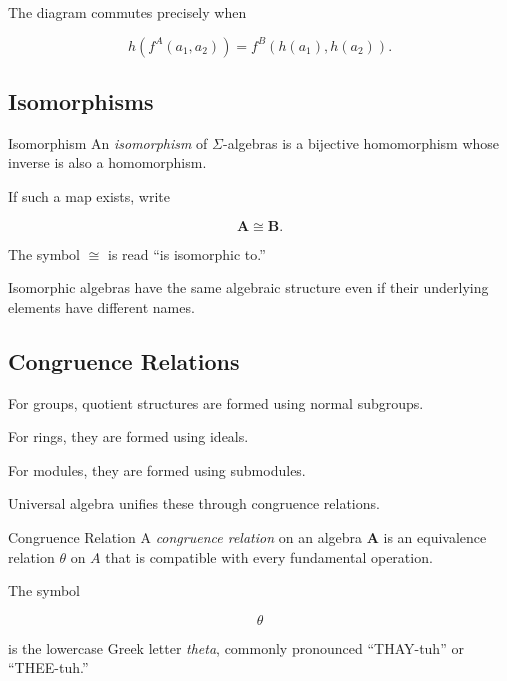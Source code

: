 The diagram commutes precisely when

\[ h(f^A(a_1,a_2))=f^B(h(a_1),h(a_2)). \]

\subsection{Isomorphisms}
\label{subsec:universal-isomorphisms}

\begin{definitionbox}{Isomorphism}
An \emph{isomorphism} of \(\Sigma\)-algebras is a bijective homomorphism
whose inverse is also a homomorphism.
\end{definitionbox}

If such a map exists, write

\[ \mathbf A\cong\mathbf B. \]

The symbol \(\cong\) is read ``is isomorphic to.''

Isomorphic algebras have the same algebraic structure even if their
underlying elements have different names.

\subsection{Congruence Relations}
\label{subsec:congruence-relations}

For groups, quotient structures are formed using normal subgroups.

For rings, they are formed using ideals.

For modules, they are formed using submodules.

Universal algebra unifies these through congruence relations.

\begin{definitionbox}{Congruence Relation}
A \emph{congruence relation} on an algebra \(\mathbf A\) is an equivalence
relation \(\theta\) on \(A\) that is compatible with every fundamental
operation.
\end{definitionbox}

The symbol

\[ \theta \]

is the lowercase Greek letter \emph{theta}, commonly pronounced
``THAY-tuh'' or ``THEE-tuh.''

